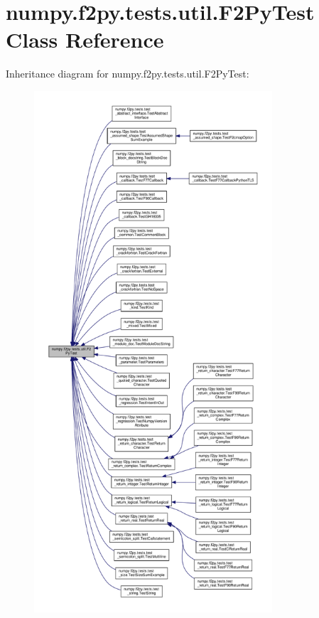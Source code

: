 \hypertarget{classnumpy_1_1f2py_1_1tests_1_1util_1_1F2PyTest}{}\section{numpy.\+f2py.\+tests.\+util.\+F2\+Py\+Test Class Reference}
\label{classnumpy_1_1f2py_1_1tests_1_1util_1_1F2PyTest}


Inheritance diagram for numpy.\+f2py.\+tests.\+util.\+F2\+Py\+Test\+:
\nopagebreak
\begin{figure}[H]
\begin{center}
\leavevmode
\includegraphics[height=550pt]{classnumpy_1_1f2py_1_1tests_1_1util_1_1F2PyTest__inherit__graph}
\end{center}
\end{figure}
